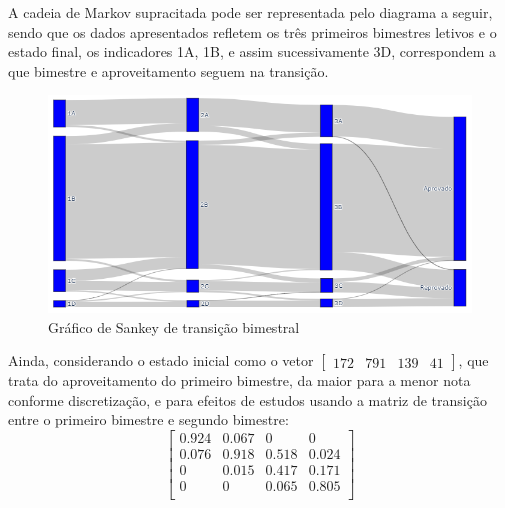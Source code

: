 \documentclass{article}
\begin{document}
\begin{center}
\end{center}

A cadeia de Markov supracitada pode ser representada pelo diagrama a seguir, sendo que os dados apresentados refletem os três primeiros bimestres letivos e o estado final, os indicadores 1A, 1B, e assim sucessivamente 3D, correspondem a que bimestre e aproveitamento seguem na transição. 

\begin{figure}[H]
\centering
\includegraphics[width=1\textwidth]{sankey2.png}
\caption{Gráfico de Sankey de transição bimestral}
\label{sankey}
\end{figure}

Ainda, considerando o estado inicial como o vetor
$
\begin{bmatrix}
    172 & 791 & 139 & 41    
\end{bmatrix}
$, que trata do aproveitamento do primeiro bimestre, da maior para a menor nota conforme discretização, e para efeitos de estudos usando a matriz de transição entre o primeiro bimestre e segundo bimestre:
\[
\begin{bmatrix}
    0.924 & 0.067 & 0 & 0 \\
    0.076 & 0.918 & 0.518 & 0.024 \\
    0 & 0.015 & 0.417 & 0.171 \\
    0 & 0 & 0.065 & 0.805 \\
\end{bmatrix} 
\]
\end{document}
